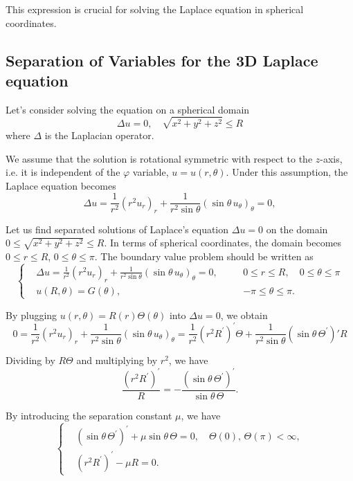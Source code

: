 This expression is crucial for solving the Laplace equation in spherical coordinates.

\subsection{Separation of Variables for the 3D Laplace equation}
Let's consider solving the equation on a spherical domain
\begin{equation} 
    \Delta u = 0, \quad \sqrt{x^2+y^2+z^2} \leq R
\end{equation}
where $\Delta$ is the Laplacian operator.

We assume that the solution is rotational symmetric with respect to the $z$-axis, i.e. it is independent of the $\varphi$ variable, $u = u(r, \theta)$. Under this assumption, the Laplace equation becomes
\begin{equation}\label{eq.laplace}
    \Delta u = \frac{1}{r^2} \left(r^2 u_r\right)_r + \frac{1}{r^2\sin\theta} \left(\sin \theta\, u_{\theta}\right)_{\theta} = 0,
\end{equation}

Let us find separated solutions of Laplace's equation $\Delta u = 0$ on the domain $0 \leq \sqrt{x^2+y^2+z^2} \leq R$. In terms of spherical coordinates, the domain becomes $0\le r \le R$, $0 \leq \theta \leq \pi$. The boundary value problem should be written as
\begin{equation}\label{eq.boundary_value_spherical_disk}
\left\{\begin{aligned}
    &\Delta u = \frac{1}{r^2} \left(r^2 u_r\right)_r + \frac{1}{r^2\sin\theta} \left(\sin \theta\, u_{\theta}\right)_{\theta} = 0, \quad && 0\leq r \leq R, \quad 0 \leq \theta \leq \pi
    \\
    &u(R, \theta)=G(\theta), && -\pi \leq \theta \leq \pi. 
\end{aligned}\right.
\end{equation}

By plugging $u(r, \theta)=R(r) \Theta(\theta)$ into $\Delta u=0$, we obtain
$$
0=\frac{1}{r^2} (r^2 u_r)_r+\frac{1}{r^2\sin\theta} \left(\sin \theta\, u_{\theta}\right)_{\theta}=\frac{1}{r^2}(r^2 R^{\prime})^{\prime} \Theta+\frac{1}{r^2\sin\theta} (\sin\theta\,\Theta^{\prime})' R
$$

Dividing by $R \Theta$ and multiplying by $r^2$, we have
$$
\frac{(r^2 R^{\prime})^{\prime}}{R} = - \frac{(\sin\theta\,\Theta^{\prime})^{\prime}}{\sin\theta\,\Theta}.
$$


By introducing the separation constant $\mu$, we have
\begin{equation}\label{eq.Laplace_separation_var_spherical}
\left\{\begin{aligned}
    &(\sin\theta\,\Theta^{\prime})^{\prime}+\mu \sin\theta\,\Theta=0, \quad \Theta(0),\, \Theta(\pi)  < \infty, 
    \\
    &(r^2 R^{\prime})^{\prime} - \mu R = 0.
\end{aligned}
\right.
\end{equation}

